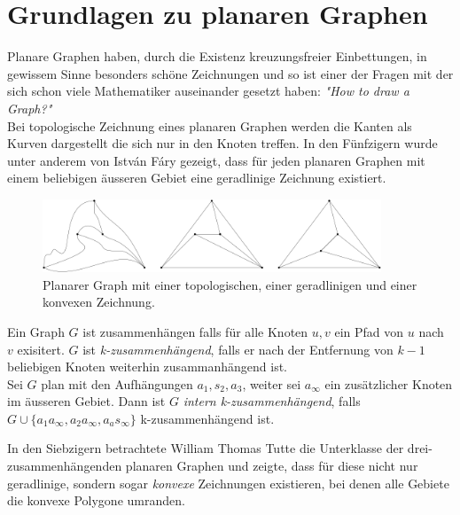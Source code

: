 \chapter{Grundlagen zu planaren Graphen}\label{prerequisites}

Planare Graphen haben, durch die Existenz kreuzungsfreier Einbettungen, in gewissem Sinne besonders schöne Zeichnungen und so ist einer der Fragen mit der sich schon viele Mathematiker auseinander gesetzt haben: \textit{"How to draw a Graph?"}\cite{tutte63}\\

Bei topologische Zeichnung eines planaren Graphen werden die Kanten als Kurven dargestellt die sich nur in den Knoten treffen. In den Fünfzigern wurde unter anderem von István Fáry gezeigt, dass für jeden planaren Graphen mit einem beliebigen äusseren Gebiet eine geradlinige Zeichnung existiert. \cite{fary48}

\begin{figure}
	\centering
  \includegraphics[width=0.9\textwidth]{topo_straight_convex.png}
	\caption{Planarer Graph mit einer topologischen, einer geradlinigen und einer konvexen Zeichnung.}
	\label{cut_figure}
\end{figure}

\begin{definition}\label{int_3_con}
Ein Graph $G$ ist zusammenhängen falls für alle Knoten $u,v$ ein Pfad von $u$ nach $v$ exisitert. $G$ ist \textit{k-zusammenhängend}, falls er nach der Entfernung von $k-1$ beliebigen Knoten weiterhin zusammanhängend ist.\\
Sei $G$ plan mit den Aufhängungen $a_1,s_2,a_3$, weiter sei $a_\infty$ ein zusätzlicher Knoten im äusseren Gebiet. Dann ist $G$ \textit{intern k-zusammenhängend}, falls $G \cup \{ a_1a_\infty,a_2a_\infty,a_as_\infty \}$ k-zusammenhängend ist. 
\end{definition}

In den Siebzigern betrachtete William Thomas Tutte die Unterklasse der drei-zusammenhängenden planaren Graphen und zeigte, dass für diese nicht nur geradlinige, sondern sogar \textit{konvexe} Zeichnungen existieren, bei denen alle Gebiete die konvexe Polygone umranden. \cite{tutte63}




